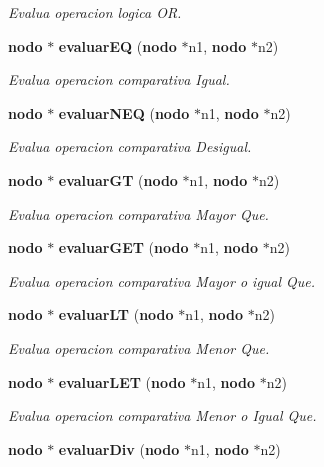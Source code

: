 \begin{CompactItemize}
\begin{CompactList}\small\item\em Evalua operacion logica OR. \item\end{CompactList}\item 
{\bf nodo} $\ast$ {\bf evaluar\-EQ} ({\bf nodo} $\ast$n1, {\bf nodo} $\ast$n2)
\begin{CompactList}\small\item\em Evalua operacion comparativa Igual. \item\end{CompactList}\item 
{\bf nodo} $\ast$ {\bf evaluar\-NEQ} ({\bf nodo} $\ast$n1, {\bf nodo} $\ast$n2)
\begin{CompactList}\small\item\em Evalua operacion comparativa Desigual. \item\end{CompactList}\item 
{\bf nodo} $\ast$ {\bf evaluar\-GT} ({\bf nodo} $\ast$n1, {\bf nodo} $\ast$n2)
\begin{CompactList}\small\item\em Evalua operacion comparativa Mayor Que. \item\end{CompactList}\item 
{\bf nodo} $\ast$ {\bf evaluar\-GET} ({\bf nodo} $\ast$n1, {\bf nodo} $\ast$n2)
\begin{CompactList}\small\item\em Evalua operacion comparativa Mayor o igual Que. \item\end{CompactList}\item 
{\bf nodo} $\ast$ {\bf evaluar\-LT} ({\bf nodo} $\ast$n1, {\bf nodo} $\ast$n2)
\begin{CompactList}\small\item\em Evalua operacion comparativa Menor Que. \item\end{CompactList}\item 
{\bf nodo} $\ast$ {\bf evaluar\-LET} ({\bf nodo} $\ast$n1, {\bf nodo} $\ast$n2)
\begin{CompactList}\small\item\em Evalua operacion comparativa Menor o Igual Que. \item\end{CompactList}\item 
{\bf nodo} $\ast$ {\bf evaluar\-Div} ({\bf nodo} $\ast$n1, {\bf nodo} $\ast$n2)

\end{CompactItemize}
